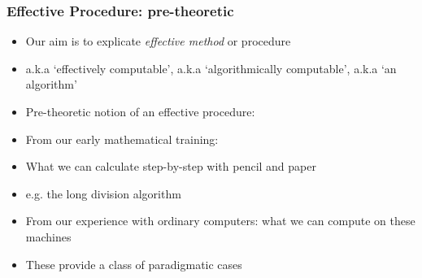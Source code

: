\begin{frame}
\frametitle{Effective Procedure: pre-theoretic}

\begin{itemize}[<+->]

\item Our aim is to explicate \textit{effective method} or procedure \item[] a.k.a `effectively computable', a.k.a `algorithmically computable', a.k.a `an algorithm'

\item Pre-theoretic notion of an effective procedure:

\item From our early mathematical training: 

\bi 

\item What we can calculate step-by-step with pencil and paper

\item e.g. the long division algorithm

\ei 

\item From our experience with ordinary computers: what we can compute on these machines


\item These provide a class of paradigmatic cases


\end{itemize}
\end{frame}

